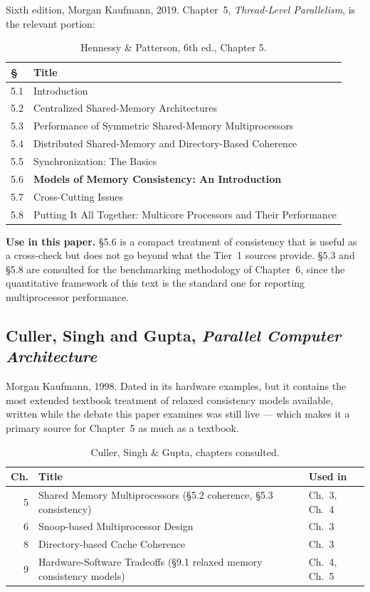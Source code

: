 Sixth edition, Morgan Kaufmann, 2019.
Chapter~5, \emph{Thread-Level Parallelism},
is the relevant portion:

\begin{table}[H]
\centering
\small
\begin{tabular}{@{}ll@{}}
\toprule
\textbf{\S} & \textbf{Title} \\
\midrule
5.1 & Introduction \\
5.2 & Centralized Shared-Memory Architectures \\
5.3 & Performance of Symmetric Shared-Memory Multiprocessors \\
5.4 & Distributed Shared-Memory and Directory-Based Coherence \\
5.5 & Synchronization: The Basics \\
5.6 & \textbf{Models of Memory Consistency: An Introduction} \\
5.7 & Cross-Cutting Issues \\
5.8 & Putting It All Together: Multicore Processors and Their Performance \\
\bottomrule
\end{tabular}
\caption{Hennessy \& Patterson, 6th ed., Chapter 5.}
\label{tab:toc-hp}
\end{table}

\noindent \textbf{Use in this paper.} \S5.6 is a compact treatment of consistency
that is useful as a cross-check but does not go beyond what the Tier~1 sources
provide.
\S5.3 and \S5.8 are consulted for the benchmarking methodology of
Chapter~6, since the quantitative framework of this text is the standard one for
reporting multiprocessor performance.

\subsection{Culler, Singh and Gupta, \emph{Parallel Computer Architecture}}

Morgan Kaufmann, 1998.
Dated in its hardware examples, but it contains the most
extended textbook treatment of relaxed consistency models available, written
while the debate this paper examines was still live --- which makes it a primary
source for Chapter~5 as much as a textbook.

\begin{table}[H]
\centering
\small
\begin{tabular}{@{}rll@{}}
\toprule
\textbf{Ch.} & \textbf{Title} & \textbf{Used in} \\
\midrule
5 & Shared Memory Multiprocessors (\S5.2 coherence, \S5.3 consistency) & Ch.~3, Ch.~4 \\
6 & Snoop-based Multiprocessor Design                                  & Ch.~3 \\
8 & Directory-based Cache Coherence                                    & Ch.~3 \\
9 & Hardware-Software Tradeoffs (\S9.1 relaxed memory consistency models) & Ch.~4, Ch.~5 \\
\bottomrule
\end{tabular}
\caption{Culler, Singh \& Gupta, chapters consulted.}
\label{tab:toc-culler}
\end{table}

